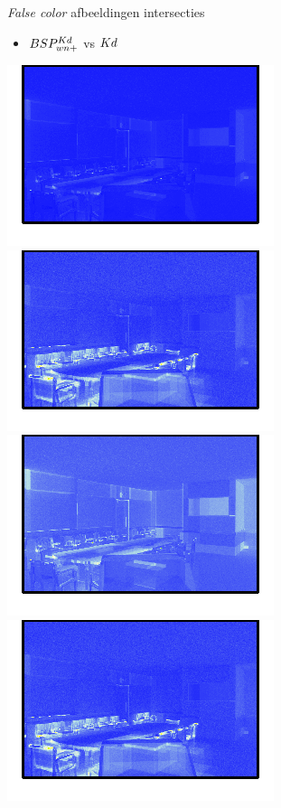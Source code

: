 \documentclass[11pt,t]{beamer}
\begin{document}
\begin{frame}[c]{\textit{False color} afbeeldingen intersecties}
	\begin{itemize}
		\item $BSP^{Kd}_{wn+}$ vs $Kd$
	\end{itemize}
	\includegraphics[height=.35\paperheight]{../img/fc/conference/bsparbitraryfastkd}
	\includegraphics[height=.35\paperheight]{../img/fc/conference/kdtree}
	\includegraphics[height=.35\paperheight]{../img/fc/conference/own-bsparbitraryfastkd}
	\includegraphics[height=.35\paperheight]{../img/fc/conference/own-kdtree}
\end{frame}
\end{document}

